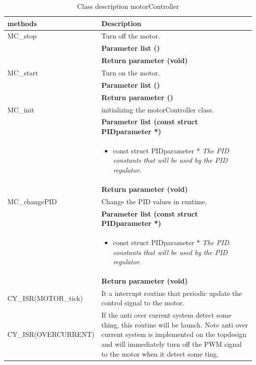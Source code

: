 \begin{table}[H]
	\centering
	\begin{tabular}{|p{5 cm}|p{10 cm}|}
		\hline
		\textbf{methods} & \textbf{Description} \\ \hline
		
		MC\_stop
		& Turn off the motor.
		\\ & \textbf{Parameter list ()}
		\\ & \textbf{Return parameter (void)}
		\\ \hline
		
		MC\_start
		& Turn on the motor.
		\\ & \textbf{Parameter list ()}
		\\ & \textbf{Return parameter ()}
		\\ \hline
		
		MC\_init
		& initializing the motorController class. 
		\\ & \textbf{Parameter list (const struct PIDparameter *)}
		\\ & \begin{itemize}
			\item {\large const struct PIDparameter *}
			\subitem \textit{The PID constants that will be used by the PID regulator.}
		\end{itemize}
		\\ & \textbf{Return parameter (void)}
		\\ \hline
		
		MC\_changePID
		& Change the PID values in runtime.
		\\ & \textbf{Parameter list (const struct PIDparameter *)}
		\\ & \begin{itemize}
			\item {\large const struct PIDparameter *}
			\subitem \textit{The PID constants that will be used by the PID regulator.}
		\end{itemize}
		\\ & \textbf{Return parameter (void)}
		\\ \hline
		
		CY\_ISR(MOTOR\_tick)
		& It a interrupt routine that periodic update the control signal to the motor.
		\\ \hline
		
		CY\_ISR(OVERCURRENT)
		& If the anti over current system detect some thing, this routine will be launch. Note anti over current system is implemented on the topdesign and will immediately turn off the PWM signal to the motor when it detect some ting.   
		\\ \hline
		
		
	\end{tabular}
	\caption{Class description motorController}
	\label{table:Class_description_motorController_MCU}
\end{table}

